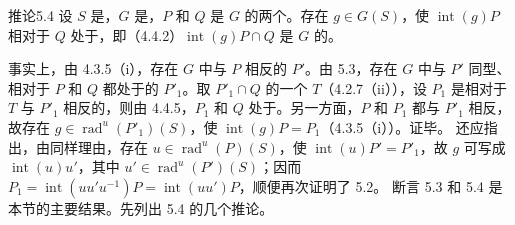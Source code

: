 \begin{SGAresult}{推论}{5.4}
设 $S$ 是，$G$ 是，$P$ 和 $Q$ 是 $G$ 的两个。存在 $g\in G(S)$，使 $\operatorname{int}(g)P$ 相对于 $Q$ 处于，即（4.4.2）$\operatorname{int}(g)P\cap Q$ 是 $G$ 的。
\end{SGAresult}
事实上，由 4.3.5（i），存在 $G$ 中与 $P$ 相反的 $P'$。由 5.3，存在 $G$ 中与 $P'$ 同型、相对于 $P$ 和 $Q$ 都处于的 $P'_1$。取 $P'_1\cap Q$ 的一个 $T$（4.2.7（ii）），设 $P_1$ 是相对于 $T$ 与 $P'_1$ 相反的，则由 4.4.5，$P_1$ 和 $Q$ 处于。另一方面，$P$ 和 $P_1$ 都与 $P'_1$ 相反，故存在 $g\in\operatorname{rad}^{u}(P'_1)(S)$，使 $\operatorname{int}(g)P=P_1$（4.3.5（i））。证毕。
还应指出，由同样理由，存在 $u\in\operatorname{rad}^{u}(P)(S)$，使 $\operatorname{int}(u)P'=P'_1$，故 $g$ 可写成 $\operatorname{int}(u)u'$，其中 $u'\in\operatorname{rad}^{u}(P')(S)$；因而
$P_1=\operatorname{int}(uu'u^{-1})P=\operatorname{int}(uu')P$，顺便再次证明了 5.2。
断言 5.3 和 5.4 是本节的主要结果。先列出 5.4 的几个推论。

